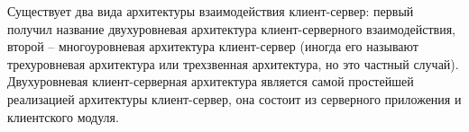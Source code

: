 Существует два вида архитектуры взаимодействия клиент-сервер: первый получил название двухуровневая архитектура клиент-серверного взаимодействия, второй – многоуровневая архитектура клиент-сервер (иногда его называют трехуровневая архитектура или трехзвенная архитектура, но это частный случай). Двухуровневая клиент-серверная архитектура является самой простейшей реализацией архитектуры клиент-сервер, она состоит из серверного приложения и клиентского модуля.


